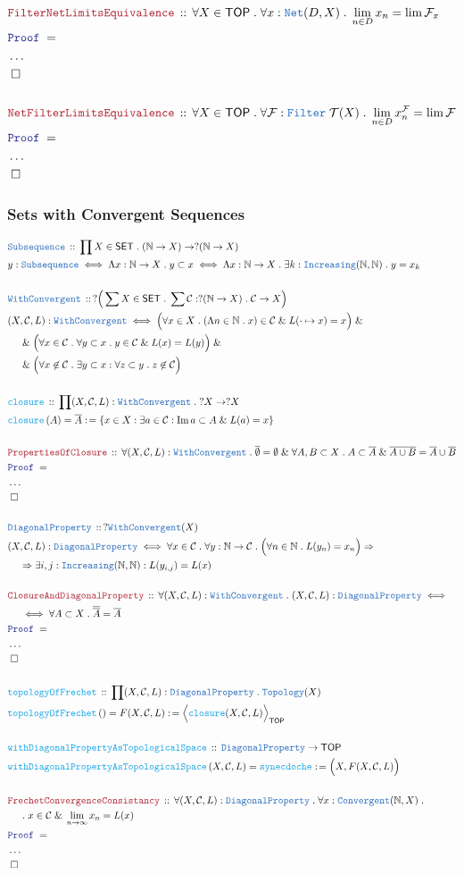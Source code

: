 \documentclass[12pt]{scrartcl}
\newcommand{\TYPE}[1]{\textcolor{NavyBlue}{\mathtt{#1}}}
\newcommand{\FUNC}[1]{\textcolor{Cerulean}{\mathtt{#1}}}
\newcommand{\LOGIC}[1]{\textcolor{Blue}{\mathtt{#1}}}
\newcommand{\THM}[1]{\textcolor{Maroon}{\mathtt{#1}}}
\renewcommand{\.}{\; . \;}
\newcommand{\de}{: \kern 0.1pc =}
\newcommand{\Act}[1]{\left( #1 \right)}
\newcommand{\Theorem}[2]{& \THM{#1} \, :: \, #2 \\ & \Proof = \\ }
\newcommand{\DeclareType}[2]{& \TYPE{#1} \, :: \, #2 \\}
\newcommand{\DefineType}[3]{& #1 : \TYPE{#2} \iff #3 \\}
\newcommand{\DefineNamedType}[4]{& #1 : \TYPE{#2} \iff #3 \iff #4 \\}
\newcommand{\DeclareFunc}[2]{& \FUNC{#1} \, :: \, #2 \\}
\newcommand{\DefineNamedFunc}[4]{&  \FUNC{#1}\Act{#2} = #3 \de #4 \\}
\newcommand{\NewLine}{\\ & \kern 1pc}
\newcommand{\Page}[1]{ \begin{align*} #1 \end{align*}   }
\newcommand{\NoProof}{ & \ldots \\ \EndProof}
\renewcommand{\And}{\; \& \;}
\newcommand{\Imply}{\Rightarrow}
\newcommand{\Nat}{\mathbb{N} }
\DeclareMathOperator*{\im}{Im}
\newcommand{\QED}{\; \square}
\newcommand{\EndProof}{& \QED \\}
\newcommand{\Proof}{\LOGIC{Proof} \; }
\renewcommand{\C}{\mathcal{C}}
\newcommand{\SET}{\mathsf{SET}}
\newcommand{\TOP}{\mathsf{TOP}}
\newcommand{\T}{\mathcal{T}}
\newcommand{\F}{\mathcal{F}}
\begin{document}
\newpage
\Page{
	\Theorem{FilterNetLimitsEquivalence}
	{
		\forall X \in \TOP \. 
		\forall x : \TYPE{Net}(D,X) \.
		\lim_{n \in D} x_n = \lim \F_x
	}
	\NoProof
	\\
	\Theorem{NetFilterLimitsEquivalence}
	{
		\forall X \in \TOP \. 
		\forall \F : \TYPE{Filter}\; \T(X) \.
		\lim_{n \in D} x_n^\F  = \lim \F
	}
	\NoProof
}
\newpage
\subsubsection{Sets with Convergent Sequences}
\Page{
	\DeclareType{Subsequence}{\prod X \in \SET \. (\Nat \to X) \to ?(\Nat \to X)}
	\DefineNamedType{y}{Subsequence}{\Lambda x : \Nat \to X \. y \subset x}
	{
		\Lambda x : \Nat \to X \. \exists k : \TYPE{Increasing}(\Nat,\Nat) \. y = x_k
	}
	\\
	\DeclareType{WithConvergent}
	{
		?\Big( \sum X \in \SET \. \sum \C : ?(\Nat \to X) \. \C \to X  \Big)
	}
	\DefineType{(X,\C,L)}
	{
		\TYPE{WithConvergent}
	}
	{
		\Big( \forall x \in X \. 
		(\Lambda n \in \Nat \. x) \in \C \And  L(\cdot \mapsto x) = x \Big) \And \NewLine \And
		\Big( 
			\forall x \in \C \. \forall y \subset x \. y \in \C \And L(x) = L(y)
		\Big) \And \NewLine \And
		\Big(
			\forall x \not \in \C \. \exists y \subset x : \forall z \subset y \. z \not \in \C
		\Big)
	}
	\\
	\DeclareFunc{closure}{\prod (X,\C,L) : \TYPE{WithConvergent} \. ?X \to ?X}
	\DefineNamedFunc{closure}{A}{\overline{A}}{\{ x \in X : \exists a \in \C : \im a \subset A \And L(a) = x \}}
	\\
	\Theorem{PropertiesOfClosure}
	{
		\forall (X,\C,L) : \TYPE{WithConvergent} \.
		\overline{\emptyset} = \emptyset \And
		\forall A,B \subset X \. 
		A \subset \overline{A} \And
		\overline{A \cup B} = \overline{A} \cup \overline{B}
	}
	\NoProof
	\\
	\DeclareType{DiagonalProperty}
	{
		? \TYPE{WithConvergent}(X)
	}
	\DefineType{(X,\C,L)}{DiagonalProperty}
	{
		\forall x \in \C \. 
		\forall y : \Nat \to \C \.
		\Big( \forall n \in \Nat \. L(y_n) = x_n  \Big) \Imply \NewLine \Imply 
		\exists i,j : \TYPE{Increasing}(\Nat,\Nat) : 
		L( y_{i,j} ) = L(x)
	}
	\\
	\Theorem{ClosureAndDiagonalProperty}
	{
		\forall (X,\C,L) : \TYPE{WithConvergent} \. 
		(X,\C,L) : \TYPE{DiagonalProperty} \iff \NewLine \iff
		\forall A \subset X \. \overline{\overline{A}} = \overline{A}
	}
	\NoProof
	\\
	\DeclareFunc{topologyOfFrechet}
	{
		\prod (X,\C,L) : \TYPE{DiagonalProperty} \.
		\TYPE{Topology}(X)
	}
	\DefineNamedFunc{topologyOfFrechet}{}{F(X,\C,L)}{ \Big\langle \FUNC{closure}(X,\C,L)  \Big\rangle_\TOP}
	\\
	\DeclareFunc{withDiagonalPropertyAsTopologicalSpace}{ \TYPE{DiagonalProperty} \to \TOP  }
	\DefineNamedFunc{withDiagonalPropertyAsTopologicalSpace}{X,\C,L}
	{ \FUNC{synecdoche} }{ \Big( X, F(X,\C,L) \Big)  }
	\\
	\Theorem{FrechetConvergenceConsistancy}
	{
		\forall (X,\C,L) : \TYPE{DiagonalProperty} \. 
		\forall x : \TYPE{Convergent}(\Nat,X) \. \NewLine \.  
		x \in \C \And \lim_{n \to \infty} x_n = L(x)
	}
	\NoProof
}
\newpage
\end{document}
